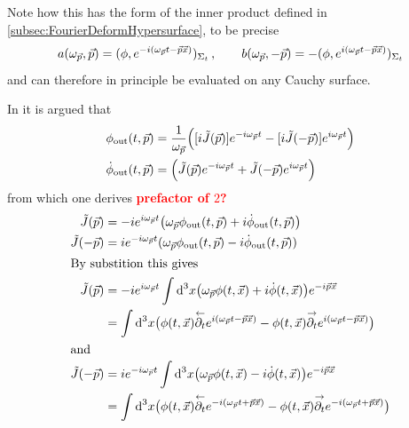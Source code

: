 Note how this has the form of the inner product defined in \ref{subsec:FourierDeformHypersurface}, to be precise
\begin{equation}
    a(\omega_{\vec{p}},\vec{p})=(\phi,e^{-{i}(\omega_{\vec{p}}t-\vec{p}\vec{x})})_{\Sigma_t}\,,\qquad b(\omega_{\vec{p}},-\vec{p})=-(\phi,e^{{i}(\omega_{\vec{p}}t-\vec{p}\vec{x})})_{\Sigma_t}
\end{equation}
and can therefore in principle be evaluated on any Cauchy surface.

In \cite{Amelino-CameliaEtAl_1997} it is argued that
\begin{subequations}
    \begin{align}
        \phi_{\text{out}}(t,\vec{p})&=\frac{1}{\omega_{\vec{p}}}\Big([{i} \tilde{J}(\vec{p})]e^{-{i}\omega_{\vec{p}}t}-[{i} \tilde{J}(-\vec{p})]e^{{i}\omega_{\vec{p}}t}\Big)\\
        \dot{\phi}_{\text{out}}(t,\vec{p})&=\Big(\tilde{J}(\vec{p})e^{-{i}\omega_{\vec{p}}t}+\tilde{J}(-\vec{p})e^{{i}\omega_{\vec{p}}t}\Big)
    \end{align}
\end{subequations}
    from which one derives \textbf{\textcolor{red}{prefactor of $2$?}}
\begin{subequations}
    \begin{align}
        \tilde{J}(\vec{p}) & =-{i} e^{{i}\omega_{\vec{p}}t}\big(\omega_{\vec{p}} \phi_{\text{out}}(t,\vec{p})+{i}\dot{\phi}_{\text{out}}(t,\vec{p})\big)                                                                         \\
        \tilde{J}(-\vec{p})&={i} e^{-{i}\omega_{\vec{p}}t}(\omega_{\vec{p}}\phi_{\text{out}}(t,\vec{p})-{i}\dot{\phi}_{\text{out}}(t,\vec{p}))\\
        \intertext{By substition this gives}
        \tilde{J}(\vec{p}) & =-{i} e^{{i}\omega_{\vec{p}}t}\int\text{d}^3x\big(\omega_{\vec{p}}\phi(t,\vec{x})+{i}\dot{\phi}(t,\vec{x})\big)e^{-{i}\vec{p}\vec{x}}                                                                  \\
                           & =\int\text{d}^3x\big(\phi(t,\vec{x})\overset{\leftarrow}{\partial_t}e^{{i}(\omega_{\vec{p}}t-\vec{p}\vec{x})}-\phi(t,\vec{x})\overset{\rightarrow}{\partial_t}e^{{i}(\omega_{\vec{p}}t-\vec{p}\vec{x})}\big)\\
                           \intertext{and}
        \tilde{J}(-\vec{p})&={i} e^{-{i}\omega_{\vec{p}}t}\int\text{d}^3x\big(\omega_{\vec{p}}\phi(t,\vec{x})-{i}\dot{\phi}(t,\vec{x})\big)e^{-{i}\vec{p}\vec{x}}\\
        &=\int\text{d}^3x\big(\phi(t,\vec{x})\overset{\leftarrow}{\partial_t}e^{-{i}(\omega_{\vec{p}}t+\vec{p}\vec{x})}-\phi(t,\vec{x})\overset{\rightarrow}{\partial_t}e^{-{i}(\omega_{\vec{p}}t+\vec{p}\vec{x})}\big)
    \end{align}
\end{subequations}
